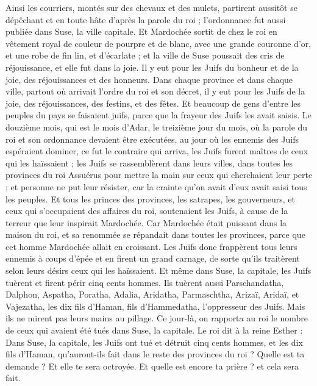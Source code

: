\begin{multicols}{2}
Ainsi les courriers, montés sur des chevaux et des mulets, partirent aussitôt se dépêchant et en toute hâte d'après la parole du roi ; l'ordonnance fut aussi publiée dans Suse, la ville capitale.
Et Mardochée sortit de chez le roi en vêtement royal de couleur de pourpre et de blanc, avec une grande couronne d'or, et une robe de fin lin, et d'écarlate ; et la ville de Suse poussait des cris de réjouissance, et elle fut dans la joie.
Il y eut pour les Juifs du bonheur et de la joie, des réjouissances et des honneurs.
Dans chaque province et dans chaque ville, partout où arrivait l'ordre du roi et son décret, il y eut pour les Juifs de la joie, des réjouissances, des festins, et des fêtes. Et beaucoup de gens d'entre les peuples du pays se faisaient juifs, parce que la frayeur des Juifs les avait saisis.
\VerseOne{}Le douzième mois, qui est le mois d'Adar, le treizième jour du mois, où la parole du roi et son ordonnance devaient être exécutées, au jour où les ennemis des Juifs espéraient dominer, ce fut le contraire qui arriva, les Juifs furent maîtres de ceux qui les haïssaient ; 
les Juifs se rassemblèrent dans leurs villes, dans toutes les provinces du roi Assuérus pour mettre la main sur ceux qui cherchaient leur perte ; et personne ne put leur résister, car la crainte qu'on avait d'eux avait saisi tous les peuples.
Et tous les princes des provinces, les satrapes, les gouverneurs, et ceux qui s'occupaient des affaires du roi, soutenaient les Juifs, à cause de la terreur que leur inspirait Mardochée.
Car Mardochée était puissant dans la maison du roi, et sa renommée se répandait dans toutes les provinces, parce que cet homme Mardochée allait en croissant.
Les Juifs donc frappèrent tous leurs ennemis à coups d'épée et en firent un grand carnage, de sorte qu'ils traitèrent selon leurs désirs ceux qui les haïssaient.
Et même dans Suse, la capitale, les Juifs tuèrent et firent périr cinq cents hommes.
Ils tuèrent aussi Parschandatha, Dalphon, Aspatha,
Poratha, Adalia, Aridatha,
Parmaschtha, Arizaï, Aridaï, et Vajezatha,
les dix fils d'Haman, fils d'Hammedatha, l'oppresseur des Juifs. Mais ils ne mirent pas leurs mains au pillage.
Ce jour-là, on rapporta au roi le nombre de ceux qui avaient été tués dans Suse, la capitale.
Le roi dit à la reine Esther : Dans Suse, la capitale, les Juifs ont tué et détruit cinq cents hommes, et les dix fils d'Haman, qu'auront-ils fait dans le reste des provinces du roi ? Quelle est ta demande ? Et elle te sera octroyée. Et quelle est encore ta prière ? et cela sera fait.

\end{multicols}
